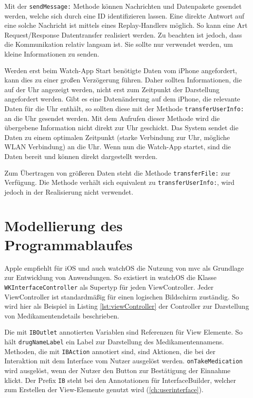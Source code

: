 
 

Mit der \lstinline{sendMessage:} Methode können Nachrichten und Datenpakete gesendet werden, welche sich durch eine ID identifizieren lassen. Eine direkte Antwort auf eine solche Nachricht ist mittels eines Replay-Handlers möglich. So kann eine Art Request/Response Datentransfer realisiert werden. Zu beachten ist jedoch, dass die Kommunikation relativ langsam ist. Sie sollte nur verwendet werden, um kleine Informationen zu senden.

Werden erst beim Watch-App Start benötigte Daten vom iPhone angefordert, kann dies zu einer großen Verzögerung führen. Daher sollten Informationen, die auf der Uhr angezeigt werden, nicht erst zum Zeitpunkt der Darstellung angefordert werden. Gibt es eine Datenänderung auf dem iPhone, die relevante Daten für die Uhr enthält, so sollten diese mit der Methode \lstinline{transferUserInfo:}  an die Uhr gesendet werden. Mit dem Aufrufen dieser Methode wird die übergebene Information nicht direkt zur Uhr geschickt. Das System sendet die Daten zu einem optimalen Zeitpunkt (starke Verbindung zur Uhr, mögliche WLAN Verbindung) an die Uhr. Wenn nun die Watch-App startet, sind die Daten bereit und können direkt dargestellt werden.

Zum Übertragen von größeren Daten steht die Methode \lstinline{transferFile:} zur Verfügung. Die Methode verhält sich equivalent zu \lstinline{transferUserInfo:}, wird jedoch in der Realisierung nicht verwendet.

\section{Modellierung des Programmablaufes}
Apple empfiehlt für iOS und auch watchOS die Nutzung von \gls{mvc} als Grundlage zur Entwicklung von Anwendungen. So existiert in watchOS die Klasse \lstinline{WKInterfaceController} als Supertyp für jeden ViewController. Jeder ViewController ist standardmäßig für einen logischen Bildschirm zuständig. So wird hier als Beispiel in Listing \ref{lst:viewController}  der Controller zur Darstellung von Medikamentendetails beschrieben.

Die mit \lstinline{IBOutlet} annotierten Variablen sind Referenzen für View Elemente. So hält \lstinline{drugNameLabel} ein Label zur Darstellung des Medikamentennamens. Methoden, die mit \lstinline{IBAction} annotiert sind, sind Aktionen, die bei der Interaktion mit dem Interface vom Nutzer ausgelöst werden. \lstinline{onTakeMedication} wird ausgelöst, wenn der Nutzer den Button zur Bestätigung der Einnahme klickt. Der Prefix \lstinline{IB} steht bei den Annotationen für InterfaceBuilder, welcher zum Erstellen der View-Elemente genutzt wird (\ref{ch:userinterface}).

